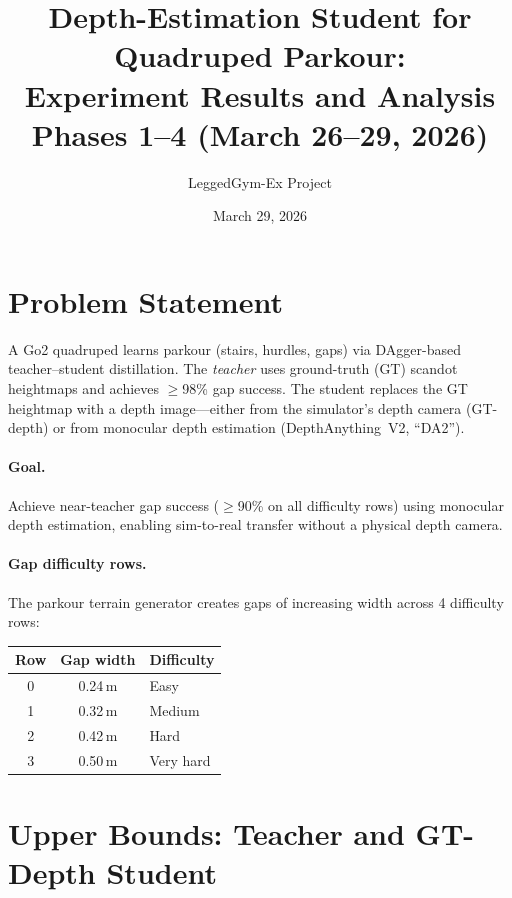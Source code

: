 \documentclass[11pt,a4paper]{article}
\title{%
  Depth-Estimation Student for Quadruped Parkour:\\
  Experiment Results and Analysis\\[6pt]
  \large Phases 1--4 (March 26--29, 2026)
}
\author{LeggedGym-Ex Project}
\date{March 29, 2026}
\begin{document}
\maketitle

\section{Problem Statement}

A Go2 quadruped learns parkour (stairs, hurdles, gaps) via DAgger-based
teacher--student distillation.  The \emph{teacher} uses ground-truth (GT)
scandot heightmaps and achieves $\geq$98\% gap success.  The student
replaces the GT heightmap with a depth image---either from the simulator's
depth camera (GT-depth) or from monocular depth estimation (DepthAnything~V2,
``DA2'').

\paragraph{Goal.}  Achieve near-teacher gap success ($\geq$90\% on all
difficulty rows) using monocular depth estimation, enabling sim-to-real
transfer without a physical depth camera.

\paragraph{Gap difficulty rows.}  The parkour terrain generator creates gaps
of increasing width across 4 difficulty rows:

\begin{center}
\begin{tabular}{ccl}
\toprule
Row & Gap width & Difficulty \\
\midrule
0 & 0.24\,m & Easy \\
1 & 0.32\,m & Medium \\
2 & 0.42\,m & Hard \\
3 & 0.50\,m & Very hard \\
\bottomrule
\end{tabular}
\end{center}

\section{Upper Bounds: Teacher and GT-Depth Student}
\end{document}
